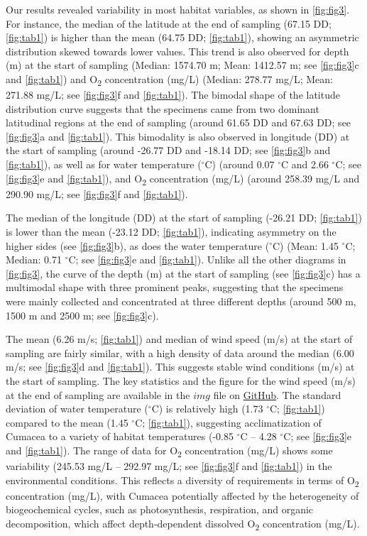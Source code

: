 Our results revealed variability in most habitat variables, as shown in \autoref{fig:fig3}. For instance, the median of the latitude at the end of sampling (67.15 DD; \autoref{fig:tab1}) is higher than the mean (64.75 DD; \autoref{fig:tab1}), showing an asymmetric distribution skewed towards lower values. This trend is also observed for depth (m) at the start of sampling (Median: 1574.70 m; Mean: 1412.57 m; see \autoref{fig:fig3}c and \autoref{fig:tab1}) and O\textsubscript{2} concentration (mg/L) (Median: 278.77 mg/L; Mean: 271.88 mg/L; see \autoref{fig:fig3}f and \autoref{fig:tab1}). The bimodal shape of the latitude distribution curve suggests that the specimens came from two dominant latitudinal regions at the end of sampling (around 61.65 DD and 67.63 DD; see \autoref{fig:fig3}a and \autoref{fig:tab1}). This bimodality is also observed in longitude (DD) at the start of sampling (around -26.77 DD and -18.14 DD; see \autoref{fig:fig3}b and \autoref{fig:tab1}), as well as for water temperature ($^\circ$C) (around 0.07 $^\circ$C and 2.66 $^\circ$C; see \autoref{fig:fig3}e and \autoref{fig:tab1}), and O\textsubscript{2} concentration (mg/L) (around 258.39 mg/L and 290.90 mg/L; see \autoref{fig:fig3}f and \autoref{fig:tab1}).

The median of the longitude (DD) at the start of sampling (-26.21 DD; \autoref{fig:tab1}) is lower than the mean (-23.12 DD; \autoref{fig:tab1}), indicating asymmetry on the higher sides (see \autoref{fig:fig3}b), as does the water temperature ($^\circ$C) (Mean: 1.45 $^\circ$C; Median: 0.71 $^\circ$C; see \autoref{fig:fig3}e and \autoref{fig:tab1}). Unlike all the other diagrams in \autoref{fig:fig3}, the curve of the depth (m) at the start of sampling (see \autoref{fig:fig3}c) has a multimodal shape with three prominent peaks, suggesting that the specimens were mainly collected and concentrated at three different depths (around 500 m, 1500 m and 2500 m; see \autoref{fig:fig3}c).

The mean (6.26 m/s; \autoref{fig:tab1}) and median of wind speed (m/s) at the start of sampling are fairly similar, with a high density of data around the median (6.00 m/s; see \autoref{fig:fig3}d and \autoref{fig:tab1}). This suggests stable wind conditions (m/s) at the start of sampling. The key statistics and the figure for the wind speed (m/s) at the end of sampling are available in the $img$ file on \href{https://github.com/tahiri-lab/Cumacea_aPhyloGeo}{GitHub}. The standard deviation of water temperature ($^\circ$C) is relatively high (1.73 $^\circ$C; \autoref{fig:tab1}) compared to the mean (1.45 $^\circ$C; \autoref{fig:tab1}), suggesting acclimatization of Cumacea to a variety of habitat temperatures (-0.85 $^\circ$C – 4.28 $^\circ$C; see \autoref{fig:fig3}e and \autoref{fig:tab1}). The range of data for O\textsubscript{2} concentration (mg/L) shows some variability (245.53 mg/L – 292.97 mg/L; see \autoref{fig:fig3}f and \autoref{fig:tab1}) in the environmental conditions. This reflects a diversity of requirements in terms of O\textsubscript{2} concentration (mg/L), with Cumacea potentially affected by the heterogeneity of biogeochemical cycles, such as photosynthesis, respiration, and organic decomposition, which affect depth-dependent dissolved O\textsubscript{2} concentration (mg/L).

